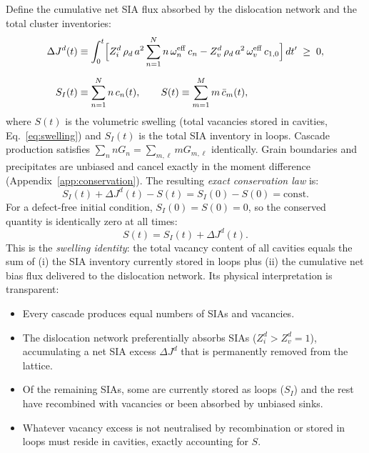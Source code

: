 \documentclass[pdflatex,sn-basic]{sn-jnl} %
\begin{document}
Define the cumulative net SIA flux absorbed by the dislocation network
and the total cluster inventories:
\begin{align}
    \Delta J^d(t)
    &\equiv \int_0^t
      \Bigl[
        Z_i^d\,\rho_d\,a^2\sum_{n=1}^{N} n\,\omega_n^{\mathrm{eff}}\,c_n
      - Z_v^d\,\rho_d\,a^2\,\omega_v^{\mathrm{eff}}\,c_{1,0}
      \Bigr]\,dt'
    \;\geq\; 0,
    \label{eq:DeltaJd}\\[6pt]
    S_I(t) &\equiv \sum_{n=1}^{N} n\,c_n(t),
    \qquad
    S(t) \equiv \sum_{m=1}^{M} m\,\bar{c}_m(t),
    \label{eq:SI_S}
\end{align}
where $S(t)$ is the volumetric swelling (total vacancies stored in
cavities, Eq.~\ref{eq:swelling}) and $S_I(t)$ is the total SIA inventory
in loops. Cascade production satisfies
$\sum_n n G_n = \sum_{m,\ell} m G_{m,\ell}$ identically. Grain
boundaries and precipitates are unbiased and cancel exactly in the
moment difference (Appendix~\ref{app:conservation}). The resulting
\emph{exact conservation law} is:
\begin{equation}\label{eq:mass_FP}
\boxed{
    S_I(t) + \Delta J^d(t) - S(t) = S_I(0) - S(0) = \mathrm{const.}
}
\end{equation}
For a defect-free initial condition, $S_I(0) = S(0) = 0$, so the
conserved quantity is identically zero at all times:
\begin{equation}\label{eq:swelling_identity}
    S(t) = S_I(t) + \Delta J^d(t).
\end{equation}
This is the \emph{swelling identity}: the total vacancy content of all
cavities equals the sum of (i) the SIA inventory currently stored in
loops plus (ii) the cumulative net bias flux delivered to the dislocation
network. Its physical interpretation is transparent:
\begin{itemize}
    \item Every cascade produces equal numbers of SIAs and vacancies.
    \item The dislocation network preferentially absorbs SIAs
    ($Z_i^d > Z_v^d = 1$), accumulating a net SIA excess $\Delta J^d$
    that is permanently removed from the lattice.
    \item Of the remaining SIAs, some are currently stored as loops
    ($S_I$) and the rest have recombined with vacancies or been absorbed
    by unbiased sinks.
    \item Whatever vacancy excess is not neutralised by recombination or
    stored in loops must reside in cavities, exactly accounting for $S$.
\end{itemize}
\end{document}
